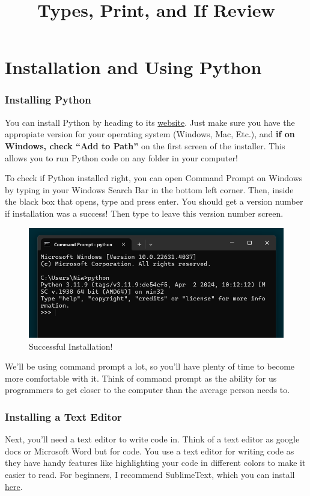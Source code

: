 \documentclass[12pt]{scrartcl}
\title{\vspace{-2em}Types, Print, and If Review}
\author{}
\date{}
\begin{document}
\maketitle
\vspace{-6em}

\section{Installation and Using Python}
\subsubsection*{Installing Python}
You can install Python by heading to its \href{https://www.python.org/}{website}. Just make sure you have the appropiate version for your operating system (Windows, Mac, Etc.), and \textbf{if on Windows, check ``Add to Path''} on the first screen of the installer. This allows you to run Python code on any folder in your computer!

To check if Python installed right, you can open Command Prompt on Windows by typing  in your Windows Search Bar in the bottom left corner. Then, inside the black box that opens, type  and press enter. You should get a version number if installation was a success! Then type  to leave this version number screen.

\begin{figure}[H]
    \centering
    \includegraphics[scale=0.6]{Successful Installation.png}
    \caption*{Successful Installation!}
\end{figure}

We'll be using command prompt a lot, so you'll have plenty of time to become more comfortable with it. Think of command prompt as the ability for us programmers to get closer to the computer than the average person needs to.
    
\subsubsection*{Installing a Text Editor}
Next, you'll need a text editor to write code in. Think of a text editor as google docs or Microsoft Word but for code. You use a text editor for writing code as they have handy features like highlighting your code in different colors to make it easier to read. For beginners, I recommend SublimeText, which you can install \href{https://www.sublimetext.com/}{here}.
\end{document}
